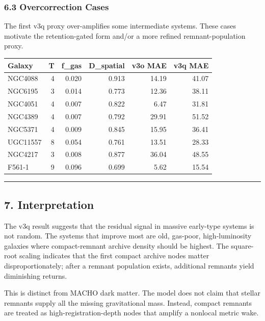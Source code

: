 \documentclass[
]{article}
\begin{document}
\subsubsection{6.3 Overcorrection Cases}\label{overcorrection-cases}

The first v3q proxy over-amplifies some intermediate systems. These
cases motivate the retention-gated form and/or a more refined
remnant-population proxy.

\begin{longtable}[]{@{}lrrrrr@{}}
\toprule\noalign{}
Galaxy & T & f\_gas & D\_spatial & v3o MAE & v3q MAE \\
\midrule\noalign{}
\endhead
\bottomrule\noalign{}
\endlastfoot
NGC4088 & 4 & 0.020 & 0.913 & 14.19 & 41.07 \\
NGC6195 & 3 & 0.014 & 0.773 & 12.36 & 38.11 \\
NGC4051 & 4 & 0.007 & 0.822 & 6.47 & 31.81 \\
NGC4389 & 4 & 0.007 & 0.792 & 29.91 & 51.52 \\
NGC5371 & 4 & 0.009 & 0.845 & 15.95 & 36.41 \\
UGC11557 & 8 & 0.054 & 0.761 & 13.51 & 28.33 \\
NGC4217 & 3 & 0.008 & 0.877 & 36.04 & 48.55 \\
F561-1 & 9 & 0.096 & 0.699 & 5.62 & 15.54 \\
\end{longtable}

\begin{center}\rule{0.5\linewidth}{0.5pt}\end{center}

\subsection{7. Interpretation}\label{interpretation}

The v3q result suggests that the residual signal in massive early-type
systems is not random. The systems that improve most are old, gas-poor,
high-luminosity galaxies where compact-remnant archive density should be
highest. The square-root scaling indicates that the first compact
archive nodes matter disproportionately; after a remnant population
exists, additional remnants yield diminishing returns.

This is distinct from MACHO dark matter. The model does not claim that
stellar remnants supply all the missing gravitational mass. Instead,
compact remnants are treated as high-registration-depth nodes that
amplify a nonlocal metric wake.
\end{document}
